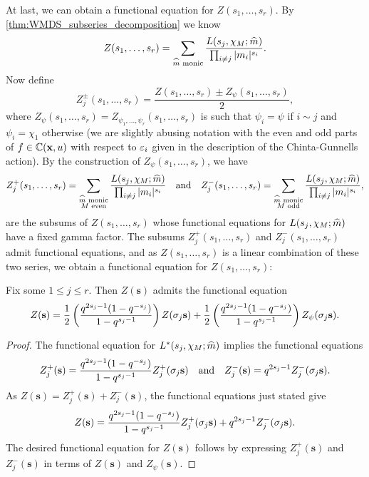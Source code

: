     At last, we can obtain a functional equation for $Z(s_{1},\ldots,s_{r})$. By \cref{thm:WMDS_subseries_decomposition} we know
    \[
        Z(s_{1},\ldots,s_{r}) = \sum_{\text{$\widehat{m}$ monic}}\frac{L(s_{j},\chi_{M};\widehat{m})}{\prod_{i \neq j}|m_{i}|^{s_{i}}}.
    \]
    Now define
    \[
        Z_{j}^{\pm}(s_{1},\ldots,s_{r}) = \frac{Z(s_{1},\ldots,s_{r}) \pm Z_{\psi}(s_{1},\ldots,s_{r})}{2},
    \]
    where $Z_{\psi}(s_{1},\ldots,s_{r}) = Z_{\psi_{1},\ldots,\psi_{r}}(s_{1},\ldots,s_{r})$ is such that $\psi_{i} = \psi$ if $i \sim j$ and $\psi_{i} = \chi_{1}$ otherwise (we are slightly abusing notation with the even and odd parts of $f \in \mathbb{C}(\mathbf{x},u)$ with respect to $\varepsilon_{i}$ given in the description of the Chinta-Gunnells action). By the construction of $Z_{\psi}(s_{1},\ldots,s_{r})$, we have
    \[
        Z_{j}^{+}(s_{1},\ldots,s_{r}) = \sum_{\substack{\text{$\widehat{m}$ monic} \\ \text{$M$ even}}}\frac{L(s_{j},\chi_{M};\widehat{m})}{\prod_{i \neq j}|m_{i}|^{s_{i}}} \quad \text{and} \quad Z_{j}^{-}(s_{1},\ldots,s_{r}) = \sum_{\substack{\text{$\widehat{m}$ monic} \\ \text{$M$ odd}}}\frac{L(s_{j},\chi_{M};\widehat{m})}{\prod_{i \neq j}|m_{i}|^{s_{i}}},
    \]
    are the subsums of $Z(s_{1},\ldots,s_{r})$ whose functional equations for $L(s_{j},\chi_{M};\widehat{m})$ have a fixed gamma factor. The subsums $Z_{j}^{+}(s_{1},\ldots,s_{r})$ and $Z_{j}^{-}(s_{1},\ldots,s_{r})$ admit functional equations, and as $Z(s_{1},\ldots,s_{r})$ is a linear combination of these two series, we obtain a functional equation for $Z(s_{1},\ldots,s_{r})$:

    \begin{theorem}\label{thm:WMDS_functional_equations}
        Fix some $1 \le j \le r$. Then $Z(\mathbf{s})$ admits the functional equation
        \[
            Z(\mathbf{s}) = \frac{1}{2}\left(\frac{q^{2s_{j}-1}(1-q^{-s_{j}})}{1-q^{s_{j}-1}}\right)Z(\sigma_{j}\mathbf{s})+\frac{1}{2}\left(\frac{q^{2s_{j}-1}(1-q^{-s_{j}})}{1-q^{s_{j}-1}}\right)Z_{\psi}(\sigma_{j}\mathbf{s}).
        \]
    \end{theorem}
    \begin{proof}
        The functional equation for $L^{\ast}(s_{j},\chi_{M};\widehat{m})$ implies the functional equations
        \[
            Z_{j}^{+}(\mathbf{s}) = \frac{q^{2s_{j}-1}(1-q^{-s_{j}})}{1-q^{s_{j}-1}}Z_{j}^{+}(\sigma_{j}\mathbf{s}) \quad \text{and} \quad Z_{j}^{-}(\mathbf{s}) = q^{2s_{j}-1}Z_{j}^{-}(\sigma_{j}\mathbf{s}).
        \]
        As $Z(\mathbf{s}) = Z_{j}^{+}(\mathbf{s})+Z_{j}^{-}(\mathbf{s})$, the functional equations just stated give
        \[
            Z(\mathbf{s}) = \frac{q^{2s_{j}-1}(1-q^{-s_{j}})}{1-q^{s_{j}-1}}Z_{j}^{+}(\sigma_{j}\mathbf{s})+q^{2s_{j}-1}Z_{j}^{-}(\sigma_{j}\mathbf{s}).
        \]
        The desired functional equation for $Z(\mathbf{s})$ follows by expressing $Z_{j}^{+}(\mathbf{s})$ and $Z_{j}^{-}(\mathbf{s})$ in terms of $Z(\mathbf{s})$ and $Z_{\psi}(\mathbf{s})$.
    \end{proof}

